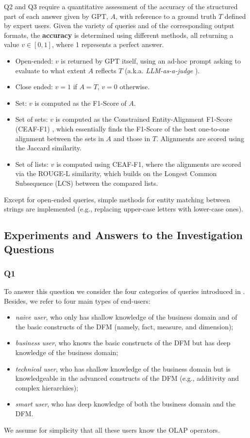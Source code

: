 Q2 and Q3 require a quantitative assessment of the accuracy of the structured part of each answer given by GPT, $A$, with reference to a ground truth $T$ defined by expert users. Given the variety of queries and of the corresponding output formats, the \textbf{accuracy} is determined using different methods, all returning a value $v \in [0,1]$, where 1 represents a perfect answer.
\begin{itemize}
    \item Open-ended: $v$ is returned by GPT itself, using an ad-hoc prompt asking to evaluate to what extent $A$ reflects $T$ (a.k.a. \textit{LLM-as-a-judge} \cite{gu2024survey}).
    \item Close ended: $v=1$ if $A=T$, $v=0$ otherwise.
    \item Set: $v$ is computed as the F1-Score of $A$.
    \item Set of sets: $v$ is computed as the Constrained Entity-Alignment F1-Score (CEAF-F1) \cite{luo2005coreference}, which essentially finds the F1-Score of the best one-to-one alignment between the sets in $A$ and those in $T$. Alignments are scored using the Jaccard similarity.
    \item Set of lists: $v$ is computed using CEAF-F1, where the alignments are scored via the ROUGE-L similarity, which builds on the Longest Common Subsequence (LCS) between the compared lists.
\end{itemize}
Except for open-ended queries, simple methods for entity matching between strings are implemented (e.g., replacing upper-case letters with lower-case ones).

\subsection{Experiments and Answers to the Investigation Questions}
\label{sec:llm-exp}

\subsubsection{Q1}

To answer this question we consider the four categories of queries introduced in . Besides, we refer to four main types of end-users:
\begin{itemize}
    \item \emph{naive user}, who only has shallow knowledge of the business domain and of the basic constructs of the DFM (namely, fact, measure, and dimension);
    \item \emph{business user}, who knows the basic constructs of the DFM but has deep knowledge of the business domain;
    \item \emph{technical user}, who has shallow knowledge of the business domain but is knowledgeable in the advanced constructs of the DFM (e.g., additivity and complex hierarchies);
    \item \emph{smart user}, who has deep knowledge of both the business domain and the DFM.
\end{itemize}
We assume for simplicity that all these users know the OLAP operators.

